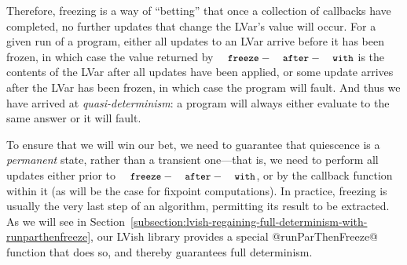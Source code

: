 Therefore, freezing is a way of ``betting'' that once a collection of
callbacks have completed, no further updates that change the LVar's
value will occur.  For a given run of a program, either all updates to
an LVar arrive before it has been frozen, in which case the value
returned by $\FAW$ is the contents of the LVar after all updates have
been applied, or some update arrives after the LVar has been frozen,
in which case the program will fault.  And thus we have arrived at
\emph{quasi-determinism}: a program will always either evaluate to the
same answer or it will fault.

To ensure that we will win our bet, we need to guarantee that
quiescence is a \emph{permanent} state, rather than a transient
one---that is, we need to perform all updates either prior to $\FAW$,
or by the callback function within it (as will be the case for
fixpoint computations).  In practice, freezing is usually the very
last step of an algorithm, permitting its result to be extracted. As
we will see in
Section~\ref{subsection:lvish-regaining-full-determinism-with-runparthenfreeze},
our LVish library provides a special @runParThenFreeze@ function that
does so, and thereby guarantees full determinism.
